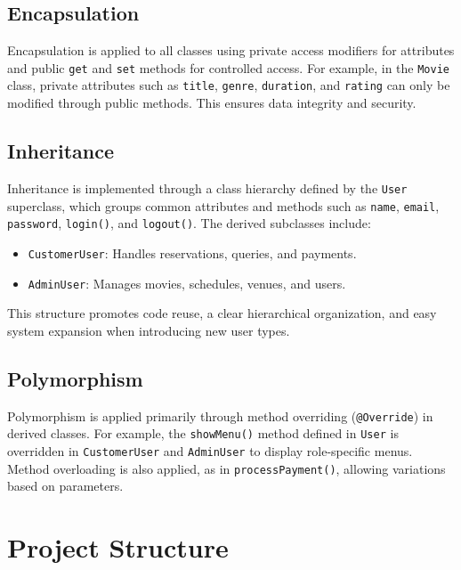 \documentclass[man]{apa7}
\begin{document}
\subsection{Encapsulation}

Encapsulation is applied to all classes using private access modifiers for attributes and public \texttt{get} and \texttt{set} methods for controlled access. For example, in the \texttt{Movie} class, private attributes such as \texttt{title}, \texttt{genre}, \texttt{duration}, and \texttt{rating} can only be modified through public methods. This ensures data integrity and security.

\subsection{Inheritance}

Inheritance is implemented through a class hierarchy defined by the \texttt{User} superclass, which groups common attributes and methods such as \texttt{name}, \texttt{email}, \texttt{password}, \texttt{login()}, and \texttt{logout()}.  
The derived subclasses include:

\begin{itemize}
  \item \texttt{CustomerUser}: Handles reservations, queries, and payments.
  \item \texttt{AdminUser}: Manages movies, schedules, venues, and users.
\end{itemize}

This structure promotes code reuse, a clear hierarchical organization, and easy system expansion when introducing new user types.

\subsection{Polymorphism}

Polymorphism is applied primarily through method overriding (\texttt{@Override}) in derived classes. For example, the \texttt{showMenu()} method defined in \texttt{User} is overridden in \texttt{CustomerUser} and \texttt{AdminUser} to display role-specific menus. Method overloading is also applied, as in \texttt{processPayment()}, allowing variations based on parameters.

\section{Project Structure}
\end{document}
